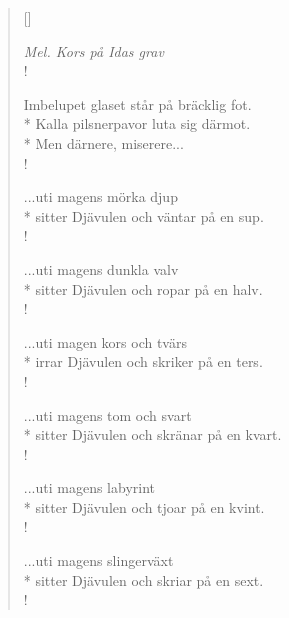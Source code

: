 
\settowidth{\versewidth}{Imbelupet glaset står på bräcklig fot.}



\begin{verse}[\versewidth]

\flagverse{}
\emph{Mel. Kors på Idas grav}\\!

Imbelupet glaset står på bräcklig fot.\\*
Kalla pilsnerpavor luta sig därmot.\\*
Men därnere, miserere...\\!


...uti magens mörka djup\\*
sitter Djävulen och väntar på en sup.\\!


...uti magens dunkla valv\\*
sitter Djävulen och ropar på en halv.\\!


...uti magen kors och tvärs\\*
irrar Djävulen och skriker på en ters.\\!


...uti magens tom och svart\\*
sitter Djävulen och skränar på en kvart.\\!


...uti magens labyrint\\*
sitter Djävulen och tjoar på en kvint.\\!


...uti magens slingerväxt\\*
sitter Djävulen och skriar på en sext.\\!


\end{verse}
